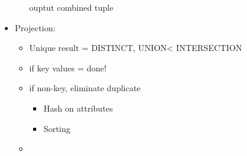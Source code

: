 \documentclass[12pt]{article}
\begin{document}
\begin{itemize}
\begin{itemize}
							ouptut combined tuple
				\end{itemize}
			\item
				Projection:
				\begin{itemize}
					\item
						Unique result = DISTINCT, UNION< INTERSECTION
					\item
						if key values = done!
					\item
						if non-key, eliminate duplicate
						\begin{itemize}
							\item
								Hash on attributes
							\item
								Sorting
						\end{itemize}
					\item
					
				\end{itemize}
		\end{itemize}
\end{document}
